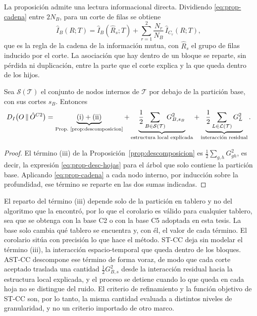 La proposición admite una lectura informacional directa. Dividiendo
\eqref{eq:prop-cadena} entre $2N_B$, para un corte de filas se obtiene
\begin{equation}\label{eq:prop-regla-cadena}
  \hat I_B(R;T) = \hat I_B(\hat R_s;T)
  + \sum_{r=1}^{2}\frac{N_r}{N_B}\,\hat I_{C_r}(R;T),
\end{equation}
que es la regla de la cadena de la información mutua, con $\hat R_s$ el grupo de
filas inducido por el corte. La asociación que hay dentro de un bloque se
reparte, sin pérdida ni duplicación, entre la parte que el corte explica y la
que queda dentro de los hijos.

\begin{corolario}\label{cor:stcc}
Sea $\mathcal{S}(\mathcal{T})$ el conjunto de nodos internos de $\mathcal{T}$
por debajo de la partición base, con sus cortes $s_B$. Entonces
\begin{equation}\label{eq:prop-desc-total}
  D_I\bigl(O\,\|\,\hat O^{C2}\bigr)
  = \underbrace{\text{(i)} + \text{(ii)}}_{\text{Prop.~\ref{prop:descomposicion}}}
  + \underbrace{\frac12\sum_{B\in\mathcal{S}(\mathcal{T})} G^2_{B,s_B}}_{\text{estructura local explicada}}
  + \underbrace{\frac12\sum_{L\in\mathcal{L}(\mathcal{T})} G^2_L}_{\text{interacción residual}} .
\end{equation}
\end{corolario}

\begin{proof}
El término (iii) de la Proposición~\ref{prop:descomposicion} es
$\tfrac12\sum_{g,h}G^2_{gh}$, es decir, la expresión
\eqref{eq:prop-desc-hojas} para el árbol que solo contiene la partición base.
Aplicando \eqref{eq:prop-cadena} a cada nodo interno, por inducción sobre la
profundidad, ese término se reparte en las dos sumas indicadas.
\end{proof}

El reparto del término (iii) depende solo de la partición en tablero y no del
algoritmo que la encontró, por lo que el corolario es válido para cualquier
tablero, sea que se obtenga con la base C2 o con la base C5 adoptada en esta
tesis. La base solo cambia qué tablero se encuentra y, con él, el valor de cada
término. El corolario sitúa con precisión lo que hace el método. ST-CC deja sin modelar
el término (iii), la interacción espacio-temporal que queda dentro de los
bloques. AST-CC descompone ese término de forma voraz, de modo que cada corte aceptado
traslada una cantidad $\tfrac12 G^2_{B,s}$ desde la interacción residual hacia
la estructura local explicada, y el proceso se detiene cuando lo que queda en
cada hoja no se distingue del ruido. El criterio de refinamiento y la función
objetivo de ST-CC son, por lo tanto, la misma cantidad evaluada a distintos
niveles de granularidad, y no un criterio importado de otro marco.

